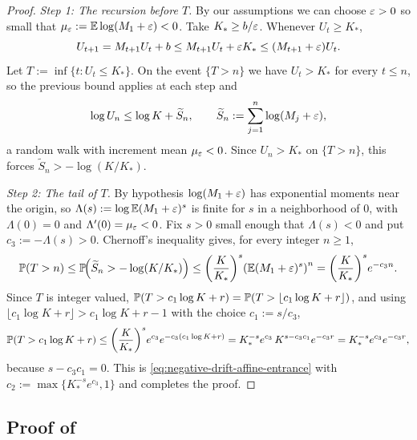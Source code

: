 \documentclass[11pt,reqno,a4paper]{article}
\newcommand{\Pp}{\P}
\newcommand{\Ee}{\E}
\begin{document}
\begin{proof}
  \emph{Step 1: The recursion before $T$.}
  By our assumptions we can choose $\varepsilon>0$ so small that
  $\mu_\eps:=\Ee\log(M_1+\eps)<0$. Take $K_\ast\geq b/\varepsilon$. Whenever
  $U_t\geq K_\ast$,
  \begin{equation*}
    U_{t+1}
    =
    M_{t+1}U_t+b
    \leq
    M_{t+1}U_t+\varepsilon K_\ast
    \leq
    (M_{t+1}+\varepsilon)U_t .
  \end{equation*}
  Let $T:=\inf\{t:U_t\leq K_\ast\}$. On the event $\{T>n\}$ we have
  $U_t>K_\ast$ for every $t\leq n$, so the previous bound applies at each step
  and
  \begin{equation*}
    \log U_n\leq\log K+\widetilde S_n,
    \qquad
    \widetilde S_n:=\sum_{j=1}^n\log(M_j+\varepsilon),
  \end{equation*}
  a random walk with increment mean $\mu_\varepsilon<0$. Since $U_n>K_\ast$ on
  $\{T>n\}$, this forces $\widetilde S_n>-\log(K/K_\ast)$.

  \emph{Step 2: The tail of $T$.}
  By hypothesis $\log(M_1+\varepsilon)$ has exponential moments near the origin, so
  $\Lambda(s):=\log\Ee(M_1+\eps)^s$ is finite for $s$ in a neighborhood of $0$,
  with $\Lambda(0)=0$ and $\Lambda'(0)=\mu_\varepsilon<0$. Fix $s>0$ small enough that
  $\Lambda(s)<0$ and put $c_3:=-\Lambda(s)>0$. Chernoff's inequality gives, for
  every integer $n\geq1$,
  \begin{equation*}
    \Pp(T>n)
    \leq
    \Pp\!\left(\widetilde S_n>-\log(K/K_\ast)\right)
    \leq
    \left(\frac K{K_\ast}\right)^{s}\left(\Ee(M_1+\eps)^s\right)^{n}
    =
    \left(\frac K{K_\ast}\right)^{s}e^{-c_3n}.
  \end{equation*}
  Since $T$ is integer valued,
  $\Pp(T>c_1\log K+r)=\Pp(T>\lfloor c_1\log K+r\rfloor)$, and using
  $\lfloor c_1\log K+r\rfloor>c_1\log K+r-1$ with the choice $c_1:=s/c_3$,
  \begin{equation*}
    \Pp(T>c_1\log K+r)
    \leq
    \left(\frac K{K_\ast}\right)^{s}e^{c_3}e^{-c_3(c_1\log K+r)}
    =
    K_\ast^{-s}e^{c_3}\,K^{s-c_3c_1}e^{-c_3r}
    =
    K_\ast^{-s}e^{c_3}e^{-c_3r},
  \end{equation*}
  because $s-c_3c_1=0$. This is \cref{eq:negative-drift-affine-entrance} with
  $c_2:=\max\{K_\ast^{-s}e^{c_3},1\}$ and completes the proof.
\end{proof}

\subsection{Proof of
\texorpdfstring{}
{Proposition~\ref{prop:gaussian-compactness-selection}}}
\label{app:common-invariant-law}
\end{document}
